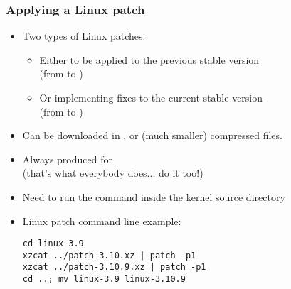 \begin{frame}[fragile]
  \frametitle{Applying a Linux patch}
  \begin{itemize}
  \item Two types of Linux patches:
        \begin{itemize}
	\item Either to be applied to the previous stable version\\
	      (from  to )
	\item Or implementing fixes to the current stable version\\
	      (from  to )
	\end{itemize}
  \item Can be downloaded in ,  or  (much
    smaller) compressed files.
  \item Always produced for \\
    (that's what everybody does... do it too!)
  \item Need to run the  command inside the kernel source
    directory
  \item Linux patch command line example:\\
\begin{verbatim}
cd linux-3.9
xzcat ../patch-3.10.xz | patch -p1
xzcat ../patch-3.10.9.xz | patch -p1
cd ..; mv linux-3.9 linux-3.10.9
\end{verbatim}
  \end{itemize}
\end{frame}
